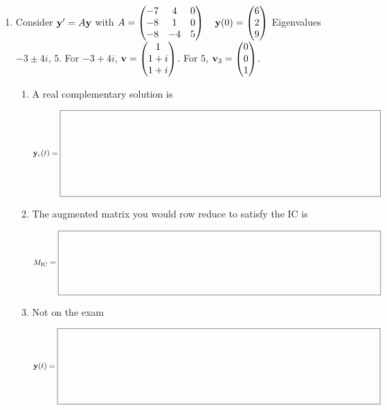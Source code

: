 \documentclass[11pt,letterpaper]{article}
\newcommand{\workbox}[2]{%
  \vcenter{\hbox{$\boxed{\rule{0pt}{#2}\makebox[#1]{}}$}}}
\begin{document}
\begin{enumerate}
\newpage
\item Consider $\mathbf{y}'=A\mathbf{y}$ with
$A=\begin{pmatrix}-7&4&0\\-8&1&0\\-8&-4&5\end{pmatrix}\quad \mathbf{y}(0)=\begin{pmatrix}6\\2\\9\end{pmatrix}$\newline
Eigenvalues $-3\pm4i,\,5$. \quad For $-3+4i$, $\mathbf{v}=\begin{pmatrix}1\\1+i\\1+i\end{pmatrix}$. \quad For $5$, $\mathbf{v}_3=\begin{pmatrix}0\\0\\1\end{pmatrix}$.
\begin{enumerate}
\item A real complementary solution is
\par $\vect{y}_c(t)=\workbox{5.65in}{1.45in}$
\vfill
\item The augmented matrix you would row reduce to satisfy the IC is
\par $M_{\mathrm{IC}}=\workbox{5.65in}{1.05in}$
\vfill
\item Not on the exam
\par $\vect{y}(t)=\workbox{5.65in}{1.25in}$
\end{enumerate}
\end{enumerate}
\end{document}
